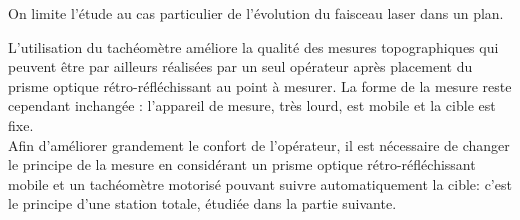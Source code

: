 On limite l'étude au cas particulier de l'évolution du faisceau laser dans un plan.\\

\ifprof
\begin{corrige}
\end{corrige}
\else
\fi

L'utilisation du tachéomètre améliore la qualité des mesures topographiques qui peuvent être par ailleurs réalisées par un seul opérateur après placement du prisme optique rétro-réfléchissant au point à mesurer. La forme de la mesure reste cependant inchangée : l'appareil de mesure, très lourd, est mobile et la cible est fixe.\\
Afin d'améliorer grandement le confort de l'opérateur, il est nécessaire de changer le principe de la mesure en considérant un prisme optique rétro-réfléchissant mobile et un tachéomètre motorisé pouvant suivre automatiquement la cible: c'est le principe d'une station totale, étudiée dans la partie suivante.

